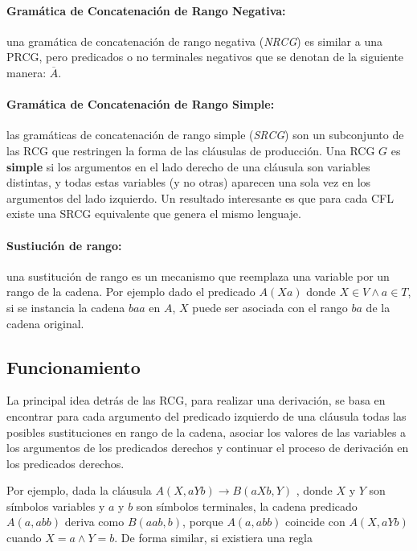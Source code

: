 \documentclass{article}
\begin{document}
\paragraph{Gramática de Concatenación de Rango Negativa:} una gramática de concatenación de rango negativa (\textit{NRCG}) es similar a una PRCG, pero predicados o no terminales negativos que se denotan de la siguiente manera: $\overline{A}$.

\paragraph{Gramática de Concatenación de Rango Simple:} las gramáticas de concatenación de rango simple (\textit{SRCG}) son un subconjunto de las RCG que restringen la forma de las cláusulas de producción.
Una RCG $G$ es \textbf{simple} si los argumentos en el lado derecho de una cláusula son variables distintas, y todas estas variables (y no otras) aparecen una sola vez en los argumentos del lado izquierdo.
Un resultado interesante es que para cada CFL existe una SRCG equivalente que genera el mismo lenguaje.

\paragraph{Sustiución de rango:} una sustitución de rango es un mecanismo que reemplaza una variable por un rango de la cadena.
Por ejemplo dado el predicado $A(Xa)$ donde $X \in V \wedge a \in T$, si se instancia la cadena $baa$ en $A$, $X$ puede
ser asociada con el rango $ba$ de la cadena original.

\subsection{Funcionamiento}

La principal idea detrás de las RCG, para realizar una derivación, se basa en encontrar para cada argumento del predicado izquierdo de una cláusula todas las
posibles sustituciones en rango de la cadena, asociar los valores de las variables a los argumentos de los predicados derechos y continuar
el proceso de derivación en los predicados derechos.

Por ejemplo, dada la cláusula $A(X,aYb)\to B(aXb,Y)$ , donde $X$ y $Y$ son símbolos variables y $a$ y $b$
son símbolos terminales, la cadena predicado $A(a,abb)$ deriva como $B(aab,b)$, porque $A(a,abb)$
coincide con $A(X,aYb)$ cuando $ X=a \wedge Y=b$. De forma similar, si existiera una regla
\end{document}
